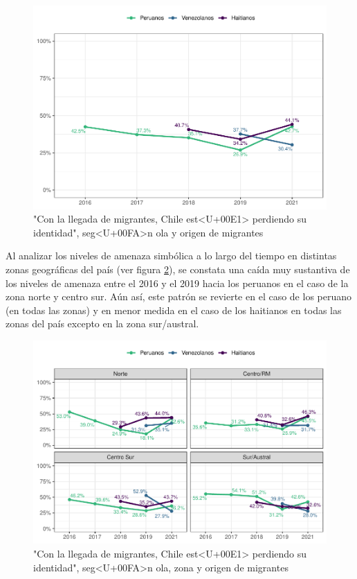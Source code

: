 \documentclass[
  12pt,
]{book}
\begin{document}
\begin{figure}

{\centering \includegraphics{reporte-elsoc_files/figure-latex/amen2-wave-1} 

}

\caption{"Con la llegada de migrantes, Chile est<U+00E1> perdiendo su identidad", seg<U+00FA>n ola y origen de migrantes}\label{fig:amen2-wave}
\end{figure}

Al analizar los niveles de amenaza simbólica a lo largo del tiempo en distintas zonas geográficas del país (ver figura \ref{fig:amen2-zona}), se constata una caída muy sustantiva de los niveles de amenaza entre el 2016 y el 2019 hacia los peruanos en el caso de la zona norte y centro sur. Aún así, este patrón se revierte en el caso de los peruano (en todas las zonas) y en menor medida en el caso de los haitianos en todas las zonas del país excepto en la zona sur/austral.

\begin{figure}

{\centering \includegraphics{reporte-elsoc_files/figure-latex/amen2-zona-1} 

}

\caption{"Con la llegada de migrantes, Chile est<U+00E1> perdiendo su identidad", seg<U+00FA>n ola, zona y origen de migrantes}\label{fig:amen2-zona}
\end{figure}
\end{document}
